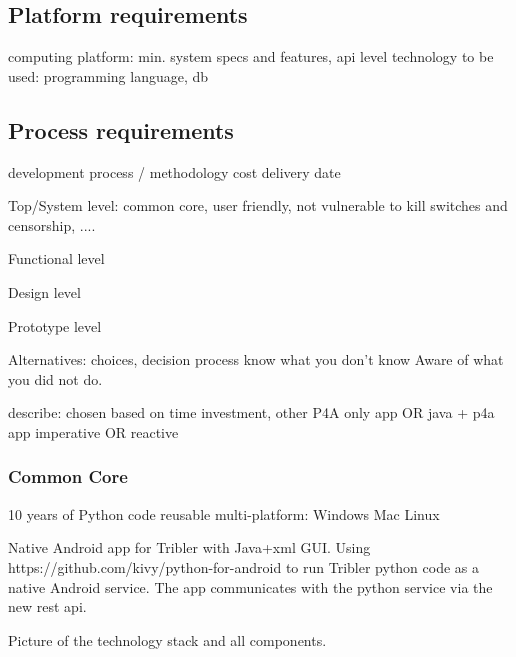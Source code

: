 \subsection{Platform requirements}

computing platform: min. system specs and features, api level
technology to be used: programming language, db

\subsection{Process requirements}

development process / methodology
cost
delivery date






Top/System level: common core, user friendly, not vulnerable to kill switches and censorship, ....


Functional level

Design level

Prototype level



Alternatives: choices, decision process
know what you don't know
Aware of what you did not do.


describe: chosen based on time investment, other 
P4A only app OR java + p4a app
imperative OR reactive



\subsubsection{Common Core}
10 years of Python code 
reusable multi-platform: Windows Mac Linux


Native Android app for Tribler with Java+xml GUI.
Using https://github.com/kivy/python-for-android to run Tribler python code as a native Android service.
The app communicates with the python service via the new rest api.

Picture of the technology stack and all components.
